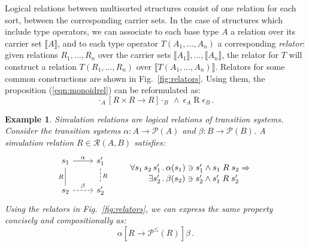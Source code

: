 \documentclass[11pt,oneside,draft]{book}
\newtheorem{example}[theorem]{Example}
\theoremstyle{definition}
\newcommand{\ifr}[1]{\mathrel{[{#1}]}}
\begin{document}
Logical relations between multisorted structures
consist of one relation for each sort,
between the corresponding carrier sets.
In the case of structures which include type operators,
we can associate to each base type $A$
a relation over its carrier set $\llbracket A \rrbracket$,
and to each type operator $T(A_1, \ldots, A_n)$
a corresponding \emph{relator}:
given relations $R_1, \ldots, R_n$ over
the carrier sets $\llbracket A_1 \rrbracket, \ldots, \llbracket A_n \rrbracket$,
the relator for $T$
will construct a relation $T(R_1, \ldots, R_n)$
over $\llbracket T(A_1, \ldots, A_n) \rrbracket$.
Relators for some common constructions are shown in Fig.~\ref{fig:relators}.
Using them, the proposition (\ref{eqn:monoidrel}) can be reformulated as:
\[
  \cdot_A \ifr{R \times R \rightarrow R} \cdot_B
  \: \wedge \:
  \epsilon_A \mathrel{R} \epsilon_B \,.
\]

\begin{example} \label{ex:simrel} %
Simulation relations are
logical relations of transition systems.
Consider the transition systems
$\alpha : A \rightarrow \mathcal{P}(A)$ and
$\beta : B \rightarrow \mathcal{P}(B)$.
A simulation relation $R \in \mathcal{R}(A, B)$
satisfies:
\[
  \begin{tikzcd}[scale=0.8]
    s_1 \arrow[r, "\alpha"]
        \arrow[d, dash, "R"'] &
    s_1' \arrow[d, dashed, dash, "R"] \\
    s_2 \arrow[r, dashed, "\beta"] &
    s_2'
  \end{tikzcd}
  \qquad
  \label{eqn:simrel}
  \begin{array}{r@{\,.\,}l}
    \forall s_1 \, s_2 \, s_1' &
      \alpha(s_1) \ni s_1' \wedge s_1 \mathrel{R} s_2 \Rightarrow
    \\[0.25ex]
    \exists s_2' &
      \beta(s_2) \ni s_2' \wedge s_1' \mathrel{R} s_2'
  \end{array}
\]
Using the relators in Fig.~\ref{fig:relators},
we can express the same property
concisely and compositionally as:
\[
  \alpha \ifr{R \rightarrow \mathcal{P}^\le(R)} \beta \,.
\]
\end{example}
\end{document}
